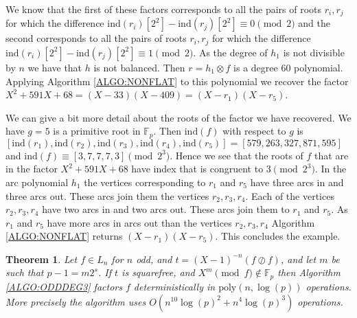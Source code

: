 \documentclass{article}
\newcounter{dummy} \numberwithin{dummy}{section}
\theoremstyle{plain}
\newtheorem{thm}[dummy]{Theorem}
\theoremstyle{definition}
\def\Fp {{ \mathbb{F} _ {p} }}
\def\ind {{ \mathrm{ind} }}
\def\poly {{ \mathrm{poly} }}
\begin{document}
		We know that the first of these factors corresponds to all the pairs of roots $r_i,r_j$ for which the difference $\ind(r_i)[2^2]-\ind(r_j)[2^2] \equiv 0 \pmod 2$ and the second corresponds to all the pairs of roots $r_i,r_j$ for which the difference $\ind(r_i)[2^2]-\ind(r_j)[2^2] \equiv 1 \pmod 2$. As the degree of $h_1$ is not divisible by $n$ we have that $h$ is not balanced. Then $r=h_1 \otimes f$ is a degree 60 polynomial. Applying Algorithm \ref{ALGO:NONFLAT} to this polynomial we recover the factor $X^2+591X+68=(X-33)(X-409)=(X-r_1)(X-r_5)$.
		
		We can give a bit more detail about the roots of the factor we have recovered. We have $g=5$ is a primitive root in $\Fp$. Then $\ind(f)$ with respect to $g$ is $[\ind(r_1),\ind(r_2), \ind(r_3), \ind(r_4), \ind(r_5) ]=[579,263,327,871,595]$ and $\ind(f) \equiv [3,7,7,7,3] \pmod {2^3}$. Hence we see that the roots of $f$ that are in the factor $X^2+591X+68$ have index that is congruent to $3 \pmod {2^3}$. In the arc polynomial $h_1$ the vertices corresponding to $r_1$ and $r_5$ have three arcs in and three arcs out. These arcs join them the vertices $r_2,r_3,r_4$. Each of the vertices $r_2,r_3,r_4$ have two arcs in and two arcs out. These arcs join them to $r_1$ and $r_5$. As $r_1$ and $r_5$ have more arcs in arcs out than the vertices $r_2,r_3,r_4$ Algorithm \ref{ALGO:NONFLAT} returns $(X-r_1)(X-r_5)$. This concludes the example.
		
		\begin{thm}
    \label{THM:TwoOfFour}
        Let $f \in L_n$ for $n$ odd, and $t=(X-1)^{-n}(f \oslash f)$, and let $m$ be such that $p-1=m2^s$. If $t$ is squarefree, and $X^m \pmod f \not\in \Fp$ then Algorithm \ref{ALGO:ODDDEG3} factors $f$ deterministically in $\poly(n,\log(p))$ operations. More precisely the algorithm uses $O(n^{10}\log(p)^2+n^4\log(p)^3)$ operations. 
    \end{thm}
				
\end{document}
